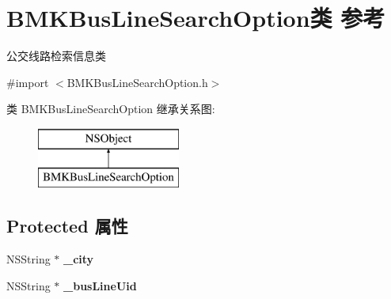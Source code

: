 \hypertarget{interface_b_m_k_bus_line_search_option}{}\section{B\+M\+K\+Bus\+Line\+Search\+Option类 参考}
\label{interface_b_m_k_bus_line_search_option}


公交线路检索信息类  




{\ttfamily \#import $<$B\+M\+K\+Bus\+Line\+Search\+Option.\+h$>$}

类 B\+M\+K\+Bus\+Line\+Search\+Option 继承关系图\+:\begin{figure}[H]
\begin{center}
\leavevmode
\includegraphics[height=2.000000cm]{interface_b_m_k_bus_line_search_option}
\end{center}
\end{figure}
\subsection*{Protected 属性}
\begin{DoxyCompactItemize}
\item 
\hypertarget{interface_b_m_k_bus_line_search_option_a7a4d92693254a3f0d2c1e79b3a5eb88b}{}N\+S\+String $\ast$ {\bfseries \+\_\+city}\label{interface_b_m_k_bus_line_search_option_a7a4d92693254a3f0d2c1e79b3a5eb88b}

\item 
\hypertarget{interface_b_m_k_bus_line_search_option_a382c85171a018c5487143fd560068c39}{}N\+S\+String $\ast$ {\bfseries \+\_\+bus\+Line\+Uid}\label{interface_b_m_k_bus_line_search_option_a382c85171a018c5487143fd560068c39}

\end{DoxyCompactItemize}
